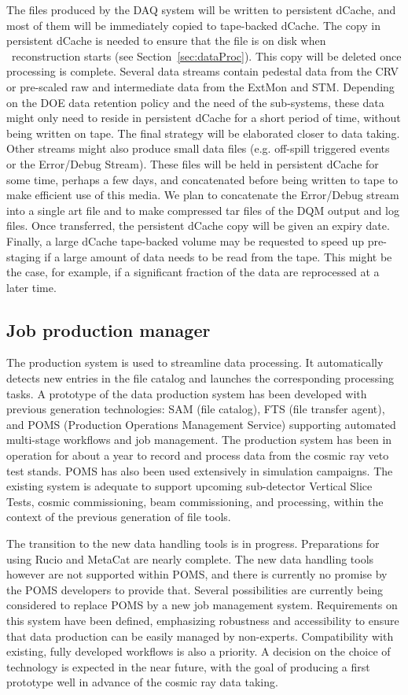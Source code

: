 The files produced by the DAQ system will be written to persistent dCache, and most of them will be immediately copied to tape-backed dCache. The copy in persistent dCache is needed to ensure that the file is on disk when \passone\ reconstruction starts (see Section~\ref{sec:dataProc}). This copy will be deleted once processing is complete. Several data streams contain pedestal data from the CRV or pre-scaled raw and intermediate data from the ExtMon and STM. Depending on the DOE data retention policy and the need of the sub-systems, these data might only need to reside in persistent dCache for a short period of time, without being written on tape. The final strategy will be elaborated closer to data taking. Other streams might also produce small data files (e.g. off-spill triggered events or the Error/Debug Stream). These files will be held in persistent dCache for some time, perhaps a few days, and concatenated before being written to tape to make efficient use of this media. We plan to concatenate the Error/Debug stream into a single art file and to make compressed tar files of the DQM output and log files. Once transferred, the persistent dCache copy will be given an expiry date. Finally, a large dCache tape-backed volume may be requested to speed up pre-staging if a large amount of data needs to be read from the tape. This might be the case, for example, if a significant fraction of the data are reprocessed at a later time.

\subsection{Job production manager}
The production system is used to streamline data processing. It automatically detects new entries in the file catalog and launches the corresponding processing tasks. A prototype of the data production system has been developed with previous generation technologies: SAM (file catalog), FTS (file transfer agent), and POMS (Production Operations Management Service) supporting automated multi-stage workflows and job management. The production system has been in operation for about a year to record and process data from the cosmic ray veto test stands. POMS has also been used extensively in simulation campaigns. The existing system is adequate to support upcoming sub-detector Vertical Slice Tests, cosmic commissioning, beam commissioning, and \runone processing, within the context of the previous generation of file tools.

The transition to the new data handling tools is in progress. Preparations for using Rucio and MetaCat are nearly complete. The new data handling tools however are not supported within POMS, and there is currently no promise by the POMS developers to provide that. Several possibilities are currently being considered to replace POMS by a new job management system. Requirements on this system have been defined, emphasizing robustness and accessibility to ensure that data production can be easily managed by non-experts. Compatibility with existing, fully developed workflows is also a priority. A decision on the choice of technology is expected in the near future, with the goal of producing a first prototype well in advance of the cosmic ray data taking.

